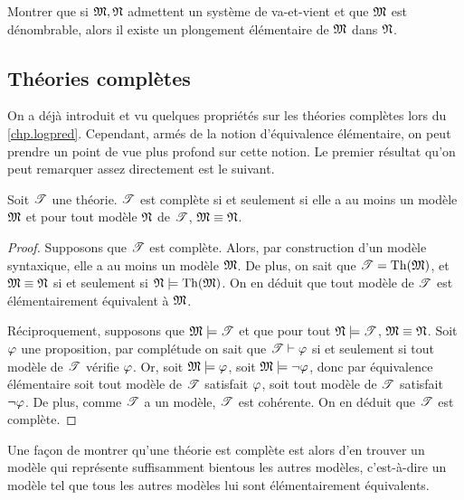 \begin{exercise}\label{exo.baf.embed}
  Montrer que si $\mathfrak{M},\mathfrak{N}$ admettent un système de va-et-vient et que
  $\mathfrak{M}$ est dénombrable, alors il existe un plongement élémentaire de
  $\mathfrak{M}$ dans $\mathfrak{N}$.
\end{exercise}

\subsection{Théories complètes}

On a déjà introduit et vu quelques propriétés sur les théories complètes lors
du \cref{chp.logpred}. Cependant, armés de la notion d'équivalence élémentaire,
on peut prendre un point de vue plus profond sur cette notion. Le premier
résultat qu'on peut remarquer assez directement est le suivant.

\begin{proposition}
  Soit $\mathscr T$ une théorie. $\mathscr T$ est complète si et seulement si elle a
  au moins un modèle $\mathfrak{M}$ et pour tout modèle $\mathfrak{N}$ de $\mathscr T$,
  $\mathfrak{M}\equiv\mathfrak{N}$.
\end{proposition}

\begin{proof}
  Supposons que $\mathscr T$ est complète. Alors, par construction d'un modèle
  syntaxique, elle a au moins un modèle $\mathfrak{M}$. De plus, on sait que
  $\mathscr T = \operatorname{Th}(\mathfrak{M})$, et $\mathfrak{M}\equiv\mathfrak{N}$ si et seulement si
  $\mathfrak{N}\models\operatorname{Th}(\mathfrak{M})$. On en déduit que tout modèle de $\mathscr T$ est
  élémentairement équivalent à $\mathfrak{M}$.

  Réciproquement, supposons que $\mathfrak{M}\models\mathscr T$ et que pour tout
  $\mathfrak{N}\models\mathscr T$, $\mathfrak{M}\equiv\mathfrak{N}$. Soit $\varphi$ une proposition,
  par complétude on sait que $\mathscr T\vdash\varphi$ si et seulement si tout
  modèle de $\mathscr T$ vérifie $\varphi$. Or, soit $\mathfrak{M}\models\varphi$, soit
  $\mathfrak{M}\models\lnot\varphi$, donc par équivalence élémentaire soit tout
  modèle de $\mathscr T$ satisfait $\varphi$, soit tout modèle de $\mathscr T$ satisfait
  $\lnot\varphi$. De plus, comme $\mathscr T$ a un modèle, $\mathscr T$ est cohérente.
  On en déduit que $\mathscr T$ est complète.
\end{proof}

Une façon de montrer qu'une théorie est complète est alors d'en trouver un
modèle qui \og représente suffisamment bien\fg tous les autres modèles,
c'est-à-dire un modèle tel que tous les autres modèles lui sont élémentairement
équivalents.

